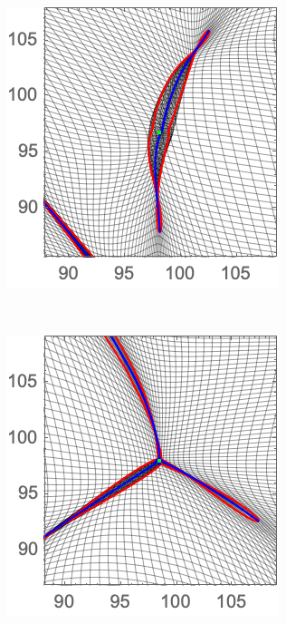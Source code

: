 \documentclass[a4paper, 11pt]{article}
\begin{document}
\begin{figure}
\begin{subfigure}[b]{0.24\textwidth}
\end{subfigure}\\
\begin{subfigure}[b]{0.24\textwidth}
\includegraphics[width=\textwidth]{Cusp_Nb_Zoom}
\end{subfigure}~
\begin{subfigure}[b]{0.24\textwidth}
\includegraphics[width=\textwidth]{Swallowtail_Nb_Zoom}

\end{subfigure}
\end{figure}
\end{document}
